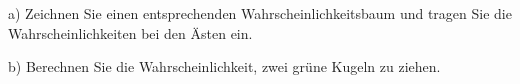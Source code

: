 a) Zeichnen Sie einen entsprechenden Wahrscheinlichkeitsbaum und tragen Sie die
Wahrscheinlichkeiten bei den Ästen ein.



b) Berechnen Sie die Wahrscheinlichkeit, zwei grüne Kugeln zu ziehen.
\platzFuerBerechnungenBisEndeSeite{}





\newpage
